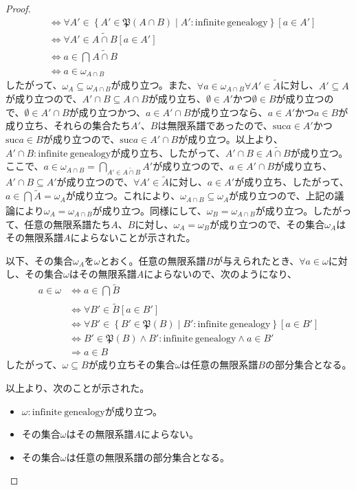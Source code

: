 \documentclass[dvipdfmx]{jsarticle}
\begin{document}
\begin{proof}
\begin{align*}
&\Leftrightarrow \forall A' \in \left\{ A'\in \mathfrak{P}(A \cap B) \middle| A':\mathrm{infinite\ genealogy} \right\}\left[ a \in A' \right]\\
&\Leftrightarrow \forall A' \in \widetilde{A \cap B}\left[ a \in A' \right]\\
&\Leftrightarrow a \in \bigcap_{} \widetilde{A \cap B}\\
&\Leftrightarrow a \in \omega_{A \cap B}
\end{align*}
したがって、$\omega_{A} \subseteq \omega_{A \cap B}$が成り立つ。また、$\forall a \in \omega_{A \cap B}\forall A' \in \widetilde{A}$に対し、$A' \subseteq A$が成り立つので、$A' \cap B \subseteq A \cap B$が成り立ち、$\emptyset \in A'$かつ$\emptyset \in B$が成り立つので、$\emptyset \in A' \cap B$が成り立つかつ、$a \in A' \cap B$が成り立つなら、$a \in A'$かつ$a \in B$が成り立ち、それらの集合たち$A'$、$B$は無限系譜であったので、${\mathrm{suc} }a \in A'$かつ${\mathrm{suc} }a \in B$が成り立つので、${\mathrm{suc} }a \in A' \cap B$が成り立つ。以上より、$A' \cap B:\mathrm{infinite\ genealogy}$が成り立ち、したがって、$A' \cap B \in \widetilde{A \cap B}$が成り立つ。ここで、$a \in \omega_{A \cap B} = \bigcap_{A' \in \widetilde{A \cap B}} A'$が成り立つので、$a \in A' \cap B$が成り立ち、$A' \cap B \subseteq A'$が成り立つので、$\forall A' \in \widetilde{A}$に対し、$a \in A'$が成り立ち、したがって、$a \in \bigcap_{} \widetilde{A} = \omega_{A}$が成り立つ。これにより、$\omega_{A \cap B} \subseteq \omega_{A}$が成り立つので、上記の議論により$\omega_{A} = \omega_{A \cap B}$が成り立つ。同様にして、$\omega_{B} = \omega_{A \cap B}$が成り立つ。したがって、任意の無限系譜たち$A$、$B$に対し、$\omega_{A} = \omega_{B}$が成り立つので、その集合$\omega_{A}$はその無限系譜$A$によらないことが示された。\par
以下、その集合$\omega_{A}$を$\omega$とおく。任意の無限系譜$B$が与えられたとき、$\forall a \in \omega$に対し、その集合$\omega$はその無限系譜$A$によらないので、次のようになり、
\begin{align*}
a \in \omega &\Leftrightarrow a \in \bigcap_{} \widetilde{B}\\
&\Leftrightarrow \forall B' \in \widetilde{B}\left[ a \in B' \right]\\
&\Leftrightarrow \forall B' \in \left\{ B'\in \mathfrak{P}(B) \middle| B':\mathrm{infinite\ genealogy} \right\}\left[ a \in B' \right]\\
&\Leftrightarrow B'\in \mathfrak{P}(B) \land B':\mathrm{infinite\ genealogy} \land a \in B'\\
&\Rightarrow a \in B
\end{align*}
したがって、$\omega \subseteq B$が成り立ちその集合$\omega$は任意の無限系譜$B$の部分集合となる。\par
以上より、次のことが示された。
\begin{itemize}
\item
  $\omega:\mathrm{infinite\ genealogy}$が成り立つ。
\item
  その集合$\omega$はその無限系譜$A$によらない。
\item
  その集合$\omega$は任意の無限系譜の部分集合となる。
\end{itemize}
\end{proof}
\end{document}
